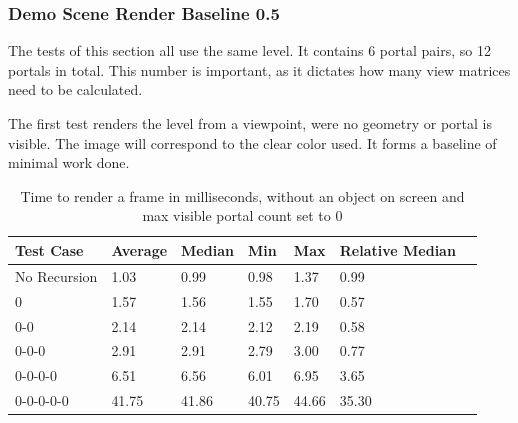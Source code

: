 \subsubsection{Demo Scene Render Baseline 0.5}
The tests of this section all use the same level. It contains 6 portal pairs, so 12 portals in total. This number is important, as it dictates how many view matrices need to be calculated.

The first test renders the level from a viewpoint, were no geometry or portal is visible. The image will correspond to the clear color used. It forms a baseline of minimal work done.

\begin{table}[H]
	\label{tab:baseline}
	\begin{tabular}{|l|l|l|l|l|l|l|}
		\hline
		Test Case    & Average & Median & Min   & Max   & Relative Median \\ \hline
		No Recursion & 1.03    & 0.99   & 0.98  & 1.37  & 0.99            \\ \hline
		0            & 1.57    & 1.56   & 1.55  & 1.70  & 0.57            \\ \hline
		0-0          & 2.14    & 2.14   & 2.12  & 2.19  & 0.58            \\ \hline
		0-0-0        & 2.91    & 2.91   & 2.79  & 3.00  & 0.77            \\ \hline
		0-0-0-0      & 6.51    & 6.56   & 6.01  & 6.95  & 3.65            \\ \hline
		0-0-0-0-0    & 41.75   & 41.86  & 40.75 & 44.66 & 35.30           \\ \hline        
	\end{tabular}
	\caption{Time to render a frame in milliseconds, without an object on screen and max visible portal count set to 0}
\end{table}

